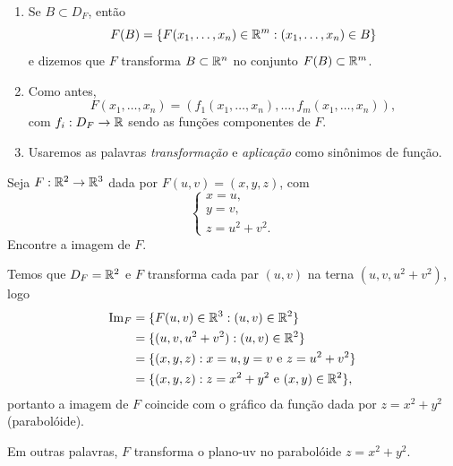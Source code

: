 \begin{remark}
    \begin{enumerate}
        \item Se \(B\subset D_F\), então \[F(B) = \{F(x_1,\dots,x_n)\in\mathbb{R}^m : (x_1,\dots,x_n)\in B\}\] e dizemos que \(F\) transforma \(B\subset\mathbb{R}^n\) no conjunto \(F(B)\subset\mathbb{R}^m\).
        \item Como antes, \[F(x_1,\dots,x_n) = (f_1(x_1,\dots
        ,x_n),\dots, f_m(x_1,\dots,x_n)),\] com \(f_i:D_F\to\mathbb{R}\) sendo as funções componentes de \(F\).
        \item Usaremos as palavras \textit{transformação} e \textit{aplicação} como sinônimos de função.
    \end{enumerate}
\end{remark}

\begin{example}
    Seja \(F:\mathbb{R}^2\to\mathbb{R}^3\) dada por \(F(u,v) = (x,y,z)\), com \[\begin{cases}
        x = u,\\ y = v,\\ z = u^2 + v^2.
    \end{cases}\] Encontre a imagem de \(F\).

    Temos que \(D_F = \mathbb{R}^2\) e \(F\) transforma cada par \((u,v)\) na terna \((u,v,u^2+v^2)\), logo
        \begin{align*}
            \operatorname{Im}_F
                & = \{F(u,v)\in\mathbb{R}^3 : (u,v)\in\mathbb{R}^2\}\\
                & = \{(u,v,u^2+v^2) : (u,v)\in\mathbb{R}^2\} \\
                & = \{(x,y,z) : x = u, y=v \text{ e } z = u^2 + v^2\}\\
                & = \{(x,y,z) : z = x^2 + y^2 \text{ e } (x,y)\in\mathbb{R}^2\},
        \end{align*}
    portanto a imagem de \(F\) coincide com o gráfico da função dada por \(z = x^2 + y^2\) (parabolóide).%

    Em outras palavras, \(F\) transforma o plano-uv no parabolóide \(z = x^2 + y^2\).
\end{example}

